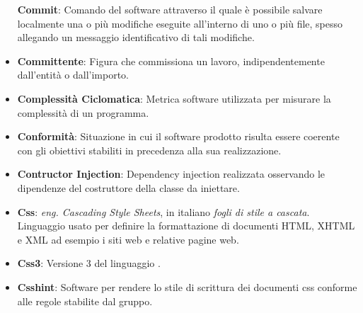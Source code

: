 \begin{itemize}
	\textbf{Commit}: Comando del software  attraverso il quale è possibile salvare localmente una o più modifiche eseguite all'interno di uno o più file, spesso allegando un messaggio identificativo di tali modifiche.
	\item
	\textbf{Committente}: Figura che commissiona un lavoro, indipendentemente dall'entità o dall'importo.
	\item
	\textbf{Complessità Ciclomatica}: Metrica software utilizzata per misurare la complessità di un programma.
	\item
	\textbf{Conformità}: Situazione in cui il software prodotto risulta essere coerente con gli obiettivi stabiliti in precedenza alla sua realizzazione.
	\item
	\textbf{Contructor Injection}: Dependency injection realizzata osservando le dipendenze del costruttore della classe da iniettare.
	\item
	\textbf{Css}: \textit{eng. Cascading Style Sheets}, in italiano \textit{fogli di stile a cascata}. Linguaggio usato per definire la formattazione di documenti HTML, XHTML e XML ad esempio i siti web e relative pagine web.
	\item
	\textbf{Css3}: Versione 3 del linguaggio .
	\item
	\textbf{Csshint}: Software per rendere lo stile di scrittura dei documenti css conforme alle regole stabilite dal gruppo.
\end{itemize}
\newpage